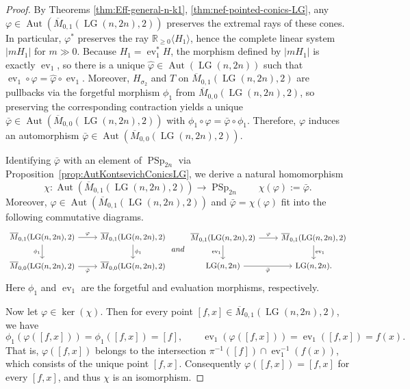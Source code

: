 \documentclass[10pt,a4paper]{amsart}
\newcommand{\Aut}{\operatorname{Aut}}
\newcommand{\LG}{\operatorname{LG}}
\DeclareMathOperator{\PSp}{PSp}
\newcommand{\ev}{\operatorname{ev}}
\begin{document}
\begin{proof}
By Theorems \ref{thm:Eff-general-n-k1}, \ref{thm:nef-pointed-conics-LG}, any
$\varphi\in\Aut(\overline{M}_{0,1}(\LG(n,2n),2))$ preserves the extremal rays of these cones. In particular, $\varphi^{*}$ preserves the ray
$\mathbb{R}_{\ge 0}\langle H_1\rangle$, hence the complete linear system $|mH_1|$ for $m\gg 0$.
Because $H_1=\ev_1^{*}H$, the morphism defined by $|mH_1|$ is exactly $\ev_1$, so there is a unique
$\widehat\varphi\in \Aut(\LG(n,2n))$ such that $\ev_1\circ \varphi=\widehat\varphi\circ \ev_1$.
Moreover, $H_{\sigma_2}$ and $T$ on $\overline{M}_{0,1}(\LG(n,2n),2)$ are pullbacks via the forgetful morphism
$\phi_1$ from $\overline{M}_{0,0}(\LG(n,2n),2)$, so preserving the corresponding contraction yields a unique
$\bar\varphi\in \Aut(\overline{M}_{0,0}(\LG(n,2n),2))$ with $\phi_1\circ \varphi=\bar\varphi\circ \phi_1$.  Therefore, $\varphi$ induces an automorphism $\bar\varphi\in\Aut(\overline{M}_{0,0}(\LG(n,2n),2))$.


Identifying $\bar\varphi$ with an element of $\PSp_{2n}$ via Proposition~\ref{prop:AutKontsevichConicsLG}, we derive a natural homomorphism
\[
\chi\colon\Aut(\overline{M}_{0,1}(\LG(n,2n),2))\rightarrow \PSp_{2n}
\qquad
\chi(\varphi):=\bar\varphi.
\]
Moreover, 
$\varphi\in\Aut(\overline{M}_{0,1}(\LG(n,2n),2))$ and  $\bar\varphi=\chi(\varphi)$ fit into the following commutative diagrams.
\[
\begin{tikzcd}
\overline{M}_{0,1}(\LG(n,2n),2) \arrow[r,"\varphi"] \arrow[d,"\phi_1"'] &
\overline{M}_{0,1}(\LG(n,2n),2) \arrow[d,"\phi_1"] \\
\overline{M}_{0,0}(\LG(n,2n),2) \arrow[r,"\bar\varphi"'] &
\overline{M}_{0,0}(\LG(n,2n),2)
\end{tikzcd}
\,\, {\rm and}\,\,
\begin{tikzcd}
\overline{M}_{0,1}(\LG(n,2n),2) \arrow[r,"\varphi"] \arrow[d,"\ev_1"'] &
\overline{M}_{0,1}(\LG(n,2n),2) \arrow[d,"\ev_1"] \\
\LG(n,2n) \arrow[r,"\bar\varphi"'] &
\LG(n,2n).
\end{tikzcd}
\]
Here $\phi_1$ and $\ev_1$ are the forgetful and evaluation morphisms, respectively.


Now let $\varphi\in\ker(\chi)$. Then for every point $[f,x]\in \overline{M}_{0,1}(\LG(n,2n),2)$, we have
\[
\phi_1(\varphi([f,x]))=\phi_1([f,x])=[f],
\qquad
\ev_1(\varphi([f,x]))=\ev_1([f,x])=f(x).
\]
That is,  $\varphi([f,x])$ belongs to the intersection
\(
\pi^{-1}([f]) \cap \ev_1^{-1}(f(x))
\), which consists of the unique point $[f,x]$. Consequently $\varphi([f,x])=[f,x]$ for every $[f,x]$, and thus $\chi$ is an isomorphism.
\end{proof}
\end{document}
